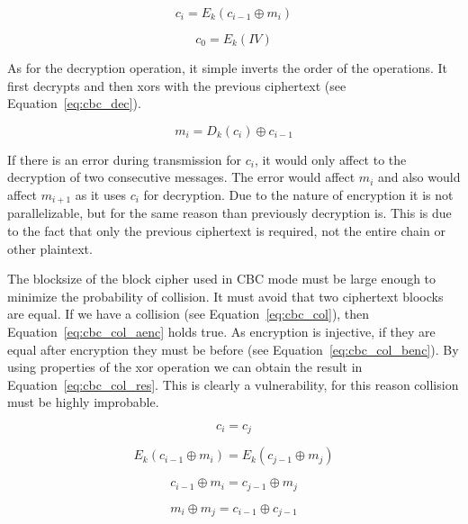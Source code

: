 \begin{equation}
  c_i = E_k(c_{i-1} \oplus m_i)
  \label{eq:cbc_enc}
\end{equation}

\begin{equation}
  c_0 = E_k(IV)
  \label{eq:cbc_iv}
\end{equation}

As for the decryption operation, it simple inverts the order of the operations.
It first decrypts and then xors with the previous ciphertext (see Equation~\ref{eq:cbc_dec}).

\begin{equation}
  m_i = D_k(c_i) \oplus c_{i-1}
  \label{eq:cbc_dec}
\end{equation}

If there is an error during transmission for $c_i$, it would only affect to the decryption of two consecutive messages.
The error would affect $m_i$ and also would affect $m_{i+1}$ as it uses $c_i$ for decryption.
Due to the nature of encryption it is not parallelizable, but for the same reason than previously decryption is.
This is due to the fact that only the previous ciphertext is required, not the entire chain or other plaintext.

The blocksize of the block cipher used in CBC mode must be large enough to minimize the probability of collision.
It must avoid that two ciphertext bloocks are equal.
If we have a collision (see Equation~\ref{eq:cbc_col}), then Equation~\ref{eq:cbc_col_aenc} holds true.
As encryption is injective, if they are equal after encryption they must be before (see Equation~\ref{eq:cbc_col_benc}).
By using properties of the xor operation we can obtain the result in Equation~\ref{eq:cbc_col_res}.
This is clearly a vulnerability, for this reason collision must be highly improbable.

\begin{equation}
  c_i = c_j
  \label{eq:cbc_col}
\end{equation}

\begin{equation}
  E_k(c_{i-1} \oplus m_i)  = E_k(c_{j-1} \oplus m_j)
  \label{eq:cbc_col_aenc}
\end{equation}

\begin{equation}
  c_{i-1} \oplus m_i  = c_{j-1} \oplus m_j
  \label{eq:cbc_col_benc}
\end{equation}

\begin{equation}
  m_i \oplus m_j = c_{i-1} \oplus c_{j-1}
  \label{eq:cbc_col_res}
\end{equation}


